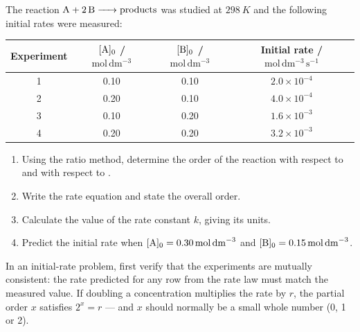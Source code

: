 \documentclass[11pt]{article}
\begin{document}
\begin{exercice}
The reaction $\ce{A + 2B -> products}$ was studied at $\SI{298}{K}$ and the following initial rates were measured:
\begin{center}
\begin{tabular}{|c|c|c|c|}
\hline
\rowcolor{popblueL} Experiment & $[\ce{A}]_0$ / $\mathrm{mol\,dm^{-3}}$ & $[\ce{B}]_0$ / $\mathrm{mol\,dm^{-3}}$ & Initial rate / $\mathrm{mol\,dm^{-3}\,s^{-1}}$ \\
\hline 1 & 0.10 & 0.10 & $2.0\times 10^{-4}$ \\
\hline 2 & 0.20 & 0.10 & $4.0\times 10^{-4}$ \\
\hline 3 & 0.10 & 0.20 & $1.6\times 10^{-3}$ \\
\hline 4 & 0.20 & 0.20 & $3.2\times 10^{-3}$ \\
\hline
\end{tabular}
\end{center}
\begin{enumerate}
\item Using the ratio method, determine the order of the reaction with respect to  and with respect to .
\item Write the rate equation and state the overall order.
\item Calculate the value of the rate constant $k$, giving its units.
\item Predict the initial rate when $[\ce{A}]_0 = \SI{0.30}{mol\,dm^{-3}}$ and $[\ce{B}]_0 = \SI{0.15}{mol\,dm^{-3}}$.
\end{enumerate}
\end{exercice}

\begin{attention}
In an initial-rate problem, first verify that the experiments are mutually consistent: the rate predicted for any row from the rate law must match the measured value. If doubling a concentration multiplies the rate by $r$, the partial order $x$ satisfies $2^{x} = r$ — and $x$ should normally be a small whole number (0, 1 or 2).
\end{attention}
\end{document}
